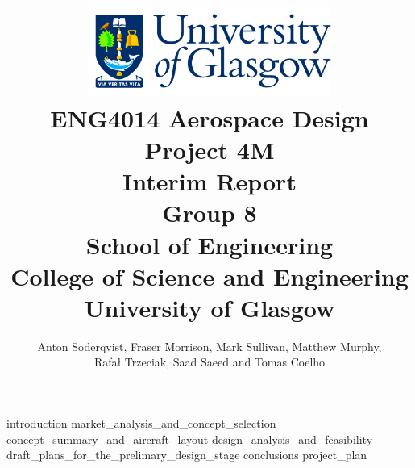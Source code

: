\documentclass[12pt,titlepage,oneside]{book}
\author{Anton Soderqvist, Fraser Morrison, Mark Sullivan, Matthew Murphy, \\ Rafał Trzeciak, Saad Saeed and Tomas Coelho}
\begin{document}
\title{
\includegraphics[width=0.6\textwidth]{GlaLogo.pdf} \\
ENG4014 Aerospace Design Project 4M \\
Interim Report \\
Group 8  \\ 
\vspace{3em}
\normalsize{School of Engineering \\
College of Science and Engineering \\
University of Glasgow \\
}
}
\maketitle
\tableofcontents

{introduction}
{market_analysis_and_concept_selection}
{concept_summary_and_aircraft_layout}
{design_analysis_and_feasibility}
{draft_plans_for_the_prelimary_design_stage}
{conclusions}
{project_plan}



\end{document}
